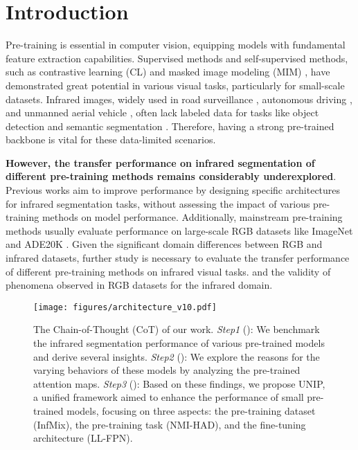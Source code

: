 \section{Introduction}
\label{sec:introduction}

Pre-training is essential in computer vision, equipping models with fundamental feature extraction capabilities. Supervised methods \citep{deit, deit3} and self-supervised methods, such as contrastive learning (CL) \citep{mocov3,dino} and masked image modeling (MIM) \citep{mae, crossmae}, have demonstrated great potential in various visual tasks, particularly for small-scale datasets. Infrared images, widely used in road surveillance \citep{birdsai}, autonomous driving \citep{mcnet}, and unmanned aerial vehicle \citep{dronevehicle}, often lack labeled data for tasks like object detection and semantic segmentation \citep{soda}. Therefore, having a strong pre-trained backbone is vital for these data-limited scenarios.


\textbf{However, the transfer performance on infrared segmentation of different pre-training methods remains considerably underexplored}. Previous works \citep{mcnet, tinn} aim to improve performance by designing specific architectures for infrared segmentation tasks, without assessing the impact of various pre-training methods on model performance. Additionally, mainstream pre-training methods \citep{mae, iBOT} usually evaluate performance on large-scale RGB datasets like ImageNet \citep{imagenet} and ADE20K \citep{ade20k}. Given the significant domain differences between RGB and infrared datasets, 
further study is necessary to evaluate the transfer performance of different pre-training methods on infrared visual tasks.
and the validity of phenomena observed in RGB datasets for the infrared domain.

\begin{figure}[t]
    \centering
    \texttt{[image: figures/architecture\_v10.pdf]}
    \vspace{-20pt}
    \caption{The Chain-of-Thought (CoT) of our work. \textit{Step1} (): We benchmark the infrared segmentation performance of various pre-trained models and derive several insights. \textit{Step2} (): We explore the reasons for the varying behaviors of these models by analyzing the pre-trained attention maps. \textit{Step3} (): Based on these findings, we propose UNIP, a unified framework aimed to enhance the performance of small pre-trained models, focusing on three aspects: the pre-training dataset (InfMix), the pre-training task (NMI-HAD), and the fine-tuning architecture (LL-FPN).}
    \label{fig:architecture}
    \vspace{-4pt}
\end{figure}



